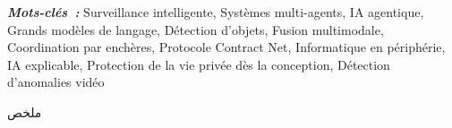 \documentclass[openany,12pt,oneside]{extreport}
\begin{document}
\vskip 0.5cm
	{\small \textbf{\textit{Mots-clés~:}} Surveillance intelligente, Systèmes multi-agents, IA agentique, Grands modèles de langage, Détection d'objets, Fusion multimodale, Coordination par enchères, Protocole Contract Net, Informatique en périphérie, IA explicable, Protection de la vie privée dès la conception, Détection d'anomalies vidéo}

\newpage
\vspace*{3cm}
\begin{center}
	{\Large\bf \begin{Arabic}ملخص\end{Arabic}}
\end{center} \vskip 1cm
\end{document}

